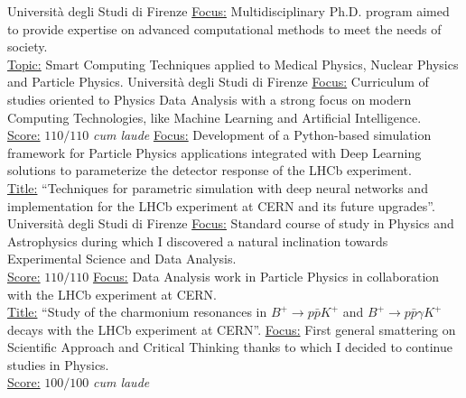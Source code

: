 \documentclass[
  a4paper, 
]{fortysecondscv}
\begin{document}
\makefrontsidebar




\begin{cvtable}[2]
	{Università degli Studi di Firenze}
		{\underline{Focus:} Multidisciplinary Ph.D. program aimed to provide expertise on advanced computational methods to meet the needs of society.\\
		\underline{Topic:} Smart Computing Techniques applied to Medical Physics, Nuclear Physics and Particle Physics.}
	{Università degli Studi di Firenze}
		{\underline{Focus:} Curriculum of studies oriented to Physics Data Analysis with a strong focus on modern Computing Technologies, like Machine Learning and Artificial Intelligence.\\
		\underline{Score:} $110/110$ \emph{cum laude}}
		{\underline{Focus:} Development of a Python-based simulation framework for Particle Physics applications integrated with Deep Learning solutions to parameterize the detector response of the LHCb experiment.\\
		\underline{Title:} ``Techniques for parametric simulation with deep neural networks and implementation for the LHCb experiment at CERN and its future upgrades''.}
	{Università degli Studi di Firenze}
		{\underline{Focus:} Standard course of study in Physics and Astrophysics during which I discovered a natural inclination towards Experimental Science and Data Analysis.\\
		\underline{Score:} $110/110$}
		{\underline{Focus:} Data Analysis work in Particle Physics in collaboration with the 
		 LHCb experiment at CERN.\\
		 \underline{Title:} ``Study of the charmonium resonances in $B^+ \to p \bar{p} K^+$ 
		 and $B^+ \to p \bar{p} \gamma K^+$ decays with the LHCb experiment at CERN''.}
		{\underline{Focus:} First general smattering on Scientific Approach and Critical Thinking thanks to which I decided to continue studies in Physics.\\
		 \underline{Score:} $100/100$ \textit{cum laude}}
\end{cvtable}
\end{document}
